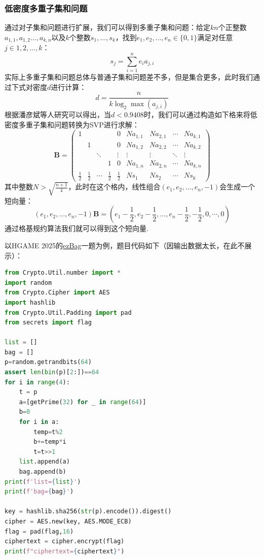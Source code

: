 \documentclass{book}
\numberwithin{equation}{subsubsection}
\begin{document}
\subsubsection{低密度多重子集和问题\cite{16}}
通过对子集和问题进行扩展，我们可以得到多重子集和问题：给定$kn$个正整数$a_{1,1},a_{1,2}\ldots,a_{k,n}$以及$k$个整数$s_1,\ldots,s_k$，找到$e_1,e_2,\ldots,e_n\in\{0,1\}$满足对任意$j\in{1,2,\ldots,k}$：
\begin{equation}
    s_j=\sum_{i=1}^{n}e_ia_{j,i}
    \nonumber
\end{equation}
实际上多重子集和问题总体与普通子集和问题差不多，但是集合更多，此时我们通过下式对密度$d$进行计算：
\begin{equation}
    d=\frac{n}{k\log_2{\max(a_{j,i})}}
    \nonumber
\end{equation}
根据潘彦斌等人研究可以得出，当$d<0.9408$时，我们可以通过构造如下格来将低密度多重子集和问题转换为SVP进行求解：
\begin{equation}
    \pmb{B}=\left(\begin{matrix}
        1&&&&0&Na_{1,1}&Na_{2,1}&\cdots&Na_{k,1}\\
        &1&&&0&Na_{1,2}&Na_{2,2}&\cdots&Na_{k,2}\\
        &&\ddots&&\vdots&\vdots&\vdots&\ddots&\vdots\\
        &&&1&0&Na_{1,n}&Na_{2,n}&\cdots&Na_{k,n}\\
        \frac{1}{2}&\frac{1}{2}&\cdots&\frac{1}{2}&\frac{1}{2}&Ns_1&Ns_2&\cdots&Ns_k
    \end{matrix}\right)
    \nonumber
\end{equation}
其中整数$N>\sqrt{\frac{n+1}{4}}$，此时在这个格内，线性组合$(e_1,e_2,\ldots,e_n,-1)$会生成一个短向量：
\begin{equation}
    (e_1,e_2,\ldots,e_n,-1)\pmb{B}=(e_1-\frac{1}{2},e_2-\frac{1}{2},\ldots,e_n-\frac{1}{2},-\frac{1}{2},0,\cdots,0)
    \nonumber
\end{equation}
通过格基规约算法我们就可以得到这个短向量.\par
以HGAME 2025的\href{https://www.nssctf.cn/problem/7037}{ezBag}一题为例，题目代码如下（因输出数据太长，在此不展示）：
\begin{lstlisting}[language=Python,basicstyle=\ttfamily,breaklines=true,keywordstyle=\bfseries\color{blue}]
from Crypto.Util.number import *
import random
from Crypto.Cipher import AES
import hashlib
from Crypto.Util.Padding import pad
from secrets import flag

list = []
bag = []
p=random.getrandbits(64)
assert len(bin(p)[2:])==64
for i in range(4):
    t = p
    a=[getPrime(32) for _ in range(64)]
    b=0
    for i in a:
        temp=t%2
        b+=temp*i
        t=t>>1
    list.append(a)
    bag.append(b)
print(f'list={list}')
print(f'bag={bag}')

key = hashlib.sha256(str(p).encode()).digest()
cipher = AES.new(key, AES.MODE_ECB)
flag = pad(flag,16)
ciphertext = cipher.encrypt(flag)
print(f"ciphertext={ciphertext}")
\end{lstlisting}
\end{document}
